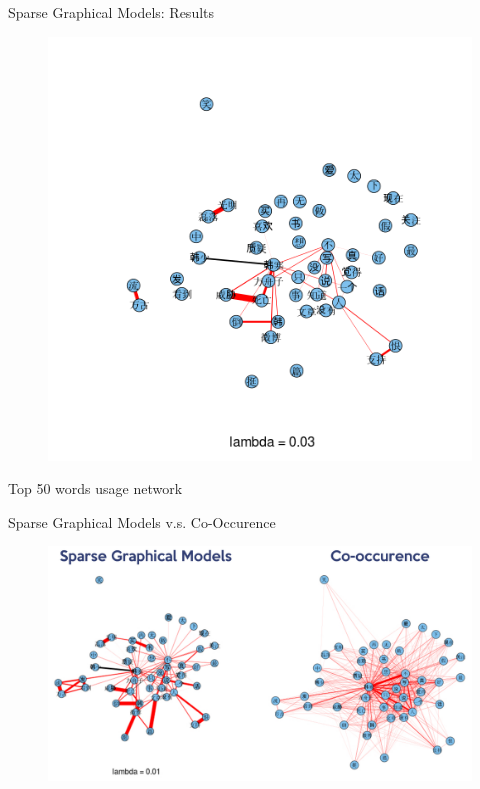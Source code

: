 \documentclass[12pt]{beamer}
\newcommand{\1}[1]{{\mathbf 1}\left\{#1\right\}}        %
\begin{document}
\begin{frame}{Sparse Graphical Models: Results}

\begin{figure}
  \centering
  \includegraphics[height=0.9\textheight]{./../../gLassoResults/glasso6.png} 
\end{figure}
\center Top 50 words usage network

\end{frame}

\begin{frame}{Sparse Graphical Models v.s. Co-Occurence}

\begin{figure}
  \centering
  \includegraphics[scale=0.35]{sgmVScooc.pdf} 
\end{figure}

\end{frame}
\end{document}
